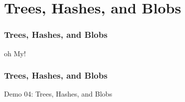 \section[Section]{Trees, Hashes, and Blobs}

\begin{frame}
\frametitle{Trees, Hashes, and Blobs}
\alert{oh My!}
\end{frame}

\begin{frame}
\frametitle{Trees, Hashes, and Blobs}
\alert{Demo 04}: Trees, Hashes, and Blobs
\end{frame}
